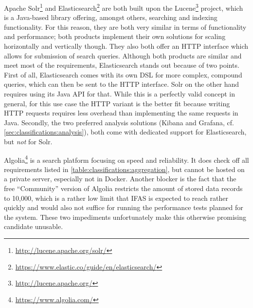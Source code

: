 \begin{table}[t]
\centering
\caption{Classification of data aggregation solutions. Support for arbitrary data structures, search capabilities, and combination of aggregations is not considered here since all solutions fulfill this requirement.}
\label{table:classifications:aggregation}
\end{table}

Apache Solr\footnote{\url{http://lucene.apache.org/solr/}} and Elasticsearch\footnote{\url{https://www.elastic.co/guide/en/elasticsearch/}} are both built upon the Lucene\footnote{\url{http://lucene.apache.org/}} project, which is a Java-based library offering, amongst others, searching and indexing functionality.
For this reason, they are both very similar in terms of functionality and performance; both products implement their own solutions for scaling horizontally and vertically though.
They also both offer an HTTP interface which allows for submission of search queries.
Although both products are similar and meet most of the requirements, Elasticsearch stands out because of two points. 
First of all, Elasticsearch comes with its own \ac{DSL} for more complex, compound queries, which can then be sent to the HTTP interface.
Solr on the other hand requires using its Java API for that.
While this is a perfectly valid concept in general, for this use case the HTTP variant is the better fit because writing HTTP requests requires less overhead than implementing the same requests in Java.
Secondly, the two preferred analysis solutions (Kibana and Grafana, cf. \cref{sec:classifications:analysis}), both come with dedicated support for Elasticsearch, but \emph{not} for Solr.

Algolia\footnote{\url{https://www.algolia.com/}} is a search platform focusing on speed and reliability.
It does check off all requirements listed in \cref{table:classifications:aggregation}, but cannot be hosted on a private server, especially not in Docker.
Another blocker is the fact that the free ``Community'' version of Algolia restricts the amount of stored data records to 10,000, which is a rather low limit that \ac{IFAS} is expected to reach rather quickly and would also not suffice for running the performance tests planned for the system.
These two impediments unfortunately make this otherwise promising candidate unusable.

